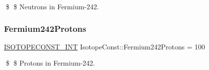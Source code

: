 \$ \$ Neutrons in Fermium-\/242. \mbox{\label{group___isotope_const-_fermium-_fm242_gade25a307a18245006a1791c5d490c622}} 
\subsubsection{\texorpdfstring{Fermium242\+Protons}{Fermium242Protons}}
{\footnotesize\ttfamily \mbox{\hyperlink{group___isotope_const-_macros_ga5f18360b3e99483a35c32d789e62621c}{I\+S\+O\+T\+O\+P\+E\+C\+O\+N\+S\+T\+\_\+\+I\+NT}} Isotope\+Const\+::\+Fermium242\+Protons = 100}

\$ \$ Protons in Fermium-\/242. 
